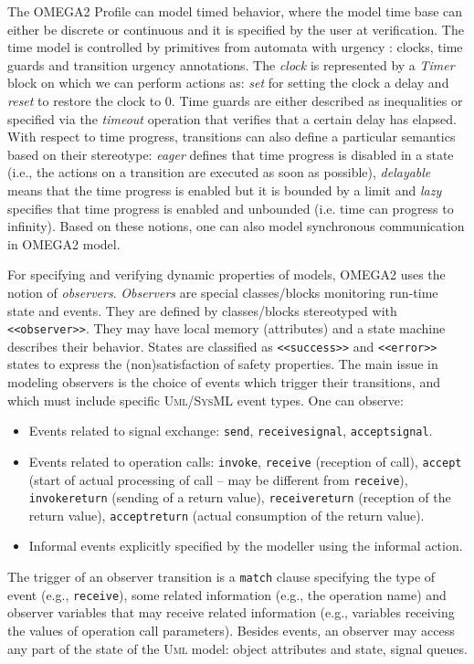 \documentclass[a4paper,twoside]{article}
\def\sysml{\textsc{SysML}}
\def\uml{\textsc{Uml}}
\begin{document}
The OMEGA2 Profile can model timed behavior, where the model time base can either be discrete or continuous and it is specified by the user at verification. The time model is controlled by primitives from automata with urgency \cite{SBornot2000}: clocks, time guards and transition urgency annotations. The \textit{clock} is represented by a \textit{Timer} block on which we can perform actions as: \textit{set} for setting the clock a delay and \textit{reset} to restore the clock to 0. Time guards are either described as inequalities or specified via the \textit{timeout} operation  that verifies that a certain delay has elapsed. With respect to time progress, transitions can also define a particular semantics based on their stereotype: \textit{eager} defines that time progress is disabled in a state (i.e., the actions on a transition are executed as soon as possible), \textit{delayable} means that the time progress is enabled but it is bounded by a limit and \textit{lazy} specifies that time progress is enabled and unbounded (i.e. time can progress to infinity). Based on these notions, one can also model synchronous communication in OMEGA2 model.

For specifying and verifying dynamic properties of models, OMEGA2 uses the notion of \textit{observers}. \textit{Observers} are special classes/blocks monitoring run-time state and events. They are defined by classes/blocks stereotyped with \texttt{<<observer>>}. They may have local memory (attributes) and a state machine describes their behavior. States are classified as \texttt{<<success>>} and \texttt{<<error>>} states to express the (non)satisfaction of safety properties. The main issue in modeling observers is the choice of events which trigger their transitions, and which must include specific \uml{}/\sysml{} event types. One can observe:

\begin{itemize}
\item Events related to signal exchange: \texttt{send}, \texttt{receivesignal}, \texttt{acceptsignal}.
\item Events related to operation calls: \texttt{invoke}, \texttt{receive} (reception of call), \texttt{accept} (start of actual processing of call -- may be different from \texttt{receive}), \texttt{invokereturn} (sending of a 
return 	value), \texttt{receivereturn} (reception of the return value), \texttt{acceptreturn} (actual consumption of the return value).
\item Informal events explicitly specified by the modeller using the informal action.
\end{itemize}
The trigger of an observer transition is a \texttt{match} clause specifying the type of event (e.g., \texttt{receive}), some related information (e.g., the operation name) and observer variables that may receive related information (e.g., variables receiving the values of operation call parameters). Besides events, an observer may access any part of the state of the \uml{} model: object attributes and state, signal queues. 
\end{document}
